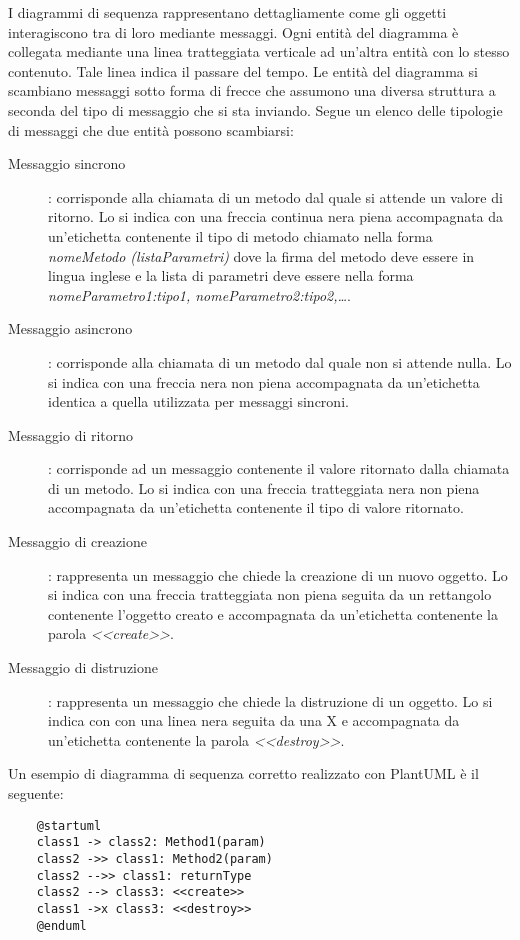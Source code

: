 \documentclass[../../norme-di-progetto.tex]{subfiles}
\begin{document}
I diagrammi di sequenza rappresentano dettagliamente come gli oggetti interagiscono tra di loro mediante messaggi. Ogni entità del diagramma è collegata mediante una linea tratteggiata verticale ad un'altra entità con lo stesso contenuto. Tale linea indica il passare del tempo. Le entità del diagramma si scambiano messaggi sotto forma di frecce che assumono una diversa struttura a seconda del tipo di messaggio che si sta inviando. Segue un elenco delle tipologie di messaggi che due entità possono scambiarsi:
\begin{description}
  \item [Messaggio sincrono]: corrisponde alla chiamata di un metodo dal quale si attende un valore di ritorno. Lo si indica con una freccia continua nera piena accompagnata da un'etichetta contenente il tipo di metodo chiamato nella forma \textit{nomeMetodo (listaParametri)} dove la firma del metodo deve essere in lingua inglese e la lista di parametri deve essere nella forma \textit{nomeParametro1:tipo1, nomeParametro2:tipo2,\ldots}.
  \item [Messaggio asincrono]: corrisponde alla chiamata di un metodo dal quale non si attende nulla. Lo si indica con una freccia nera non piena accompagnata da un'etichetta identica a quella utilizzata per messaggi sincroni.
  \item [Messaggio di ritorno]: corrisponde ad un messaggio contenente il valore ritornato dalla chiamata di un metodo. Lo si indica con una freccia tratteggiata nera non piena accompagnata da un'etichetta contenente il tipo di valore ritornato.
  \item [Messaggio di creazione]: rappresenta un messaggio che chiede la creazione di un nuovo oggetto. Lo si indica con una freccia tratteggiata non piena seguita da un rettangolo contenente l'oggetto creato e accompagnata da un'etichetta contenente la parola \textit{<<create>>}.
  \item [Messaggio di distruzione]: rappresenta un messaggio che chiede la distruzione di un oggetto. Lo si indica con con una linea nera  seguita da una X e accompagnata da un'etichetta contenente la parola \textit{<<destroy>>}.
\end{description}
Un esempio di diagramma di sequenza corretto realizzato con PlantUML è il seguente:
\begin{center}
  \begin{verbatim}
    @startuml
    class1 -> class2: Method1(param)
    class2 ->> class1: Method2(param)
    class2 -->> class1: returnType
    class2 --> class3: <<create>>
    class1 ->x class3: <<destroy>>
    @enduml
 \end{verbatim}
\end{center}
\end{document}
